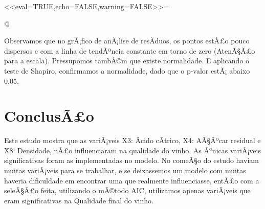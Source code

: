 \documentclass[a4paper]{article} %
\begin{document}
<<eval=TRUE,echo=FALSE,warning=FALSE>>=



@

Observamos que no grÃ¡fico de anÃ¡lise de resÃ­duos, os pontos estÃ£o pouco dispersos e com a linha de tendÃªncia constante em torno de zero (AtenÃ§Ã£o para a escala). Pressupomos tambÃ©m que existe normalidade. E aplicando o teste de Shapiro, confirmamos a normalidade, dado que o p-valor estÃ¡ abaixo 0.05.
\pagebreak


\section{ConclusÃ£o}

Este estudo mostra que as variÃ¡veis X3: Ãcido cÃ­trico, X4: AÃ§Ãºcar residual e X8: Densidade, nÃ£o influenciaram na qualidade do vinho. As Ãºnicas variÃ¡veis significativas foram as implementadas no modelo. No comeÃ§o do estudo haviam muitas variÃ¡veis para se trabalhar, e se deixassemos um modelo com muitas haveria dificuldade em encontrar uma que realmente influenciasse, entÃ£o com a seleÃ§Ã£o feita, utilizando o mÃ©todo AIC, utilizamos apenas variÃ¡veis que eram significativas na Qualidade final do vinho.
\end{document}
